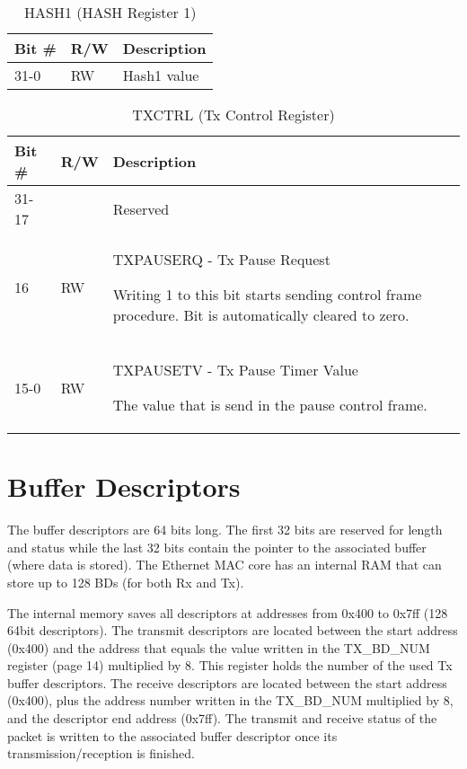 \begin{table}[H]
  \centering
  \begin{tabularx}{\textwidth}{|l|l|X|}
    
    \hline
    \rowcolor{iob-green}
    {\bf Bit \#} & {\bf R/W} & {\bf Description} \\ \hline

    31-0   & RW  & Hash1 value \\ \hline
  \end{tabularx}
    \caption{HASH1 (HASH Register 1)}
  \label{swreg_details:hash1}
\end{table}

\begin{table}[H]
  \centering
  \begin{tabularx}{\textwidth}{|l|l|X|}
    
    \hline
    \rowcolor{iob-green}
    {\bf Bit \#} & {\bf R/W} & {\bf Description} \\ \hline

    31-17   &   & Reserved \\ \hline
    \rowcolor{iob-blue}
    16      & RW & TXPAUSERQ - Tx Pause Request

                Writing 1 to this bit starts sending control frame procedure.
                Bit is automatically cleared to zero. \\ \hline
    15-0    & RW & TXPAUSETV - Tx Pause Timer Value

                 The value that is send in the pause control frame.\\ \hline
  \end{tabularx}
    \caption{TXCTRL (Tx Control Register)}
  \label{swreg_details:txctrl}
\end{table}

\section{Buffer Descriptors}
\label{sec:buffer_descriptors}
The buffer descriptors are 64 bits long. The first 32 bits are reserved for
length and status while the last 32 bits contain the pointer to the associated
buffer (where data is stored). The Ethernet MAC core has an internal RAM that
can store up to 128 BDs (for both Rx and Tx). 

The internal memory saves all descriptors at addresses from 0x400 to 0x7ff (128
64bit descriptors). The transmit descriptors are located between the start
address (0x400) and the address that equals the value written in the
TX\_BD\_NUM register (page 14) multiplied by 8. This register holds the number
of the used Tx buffer descriptors. The receive descriptors are located between
the start address (0x400), plus the address number written in the TX\_BD\_NUM
multiplied by 8, and the descriptor end address (0x7ff). The transmit and
receive status of the packet is written to the associated buffer descriptor
once its transmission/reception is finished.

